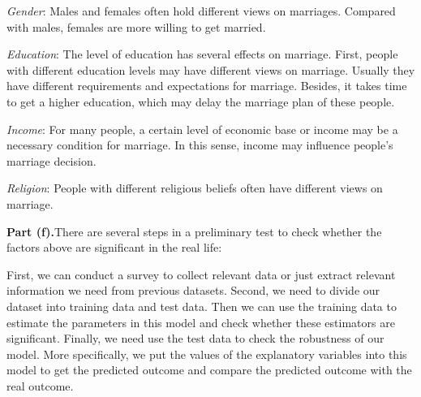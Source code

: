 \documentclass[letterpaper,12pt]{article}
\theoremstyle{definition}
\begin{document}
\emph{Gender}: Males and females often hold different views on marriages. Compared with males, females are more willing to get married.

\emph{Education}: The level of education has several effects on marriage. First, people with different education levels may have different views on marriage. Usually they have different requirements and expectations for marriage. Besides, it takes time to get a higher education, which may delay the marriage plan of these people.

\emph{Income}: For many people, a certain level of economic base or income may be a necessary condition for marriage. In this sense, income may influence people’s marriage decision.

\emph{Religion}: People with different religious beliefs often have different views on marriage.

\textbf{Part (f).}There are several steps in a preliminary test to check whether the factors above are significant in the real life:

First, we can conduct a survey to collect relevant data or just extract relevant information we need from previous datasets. Second, we need to divide our dataset into training data and test data. Then we can use the training data to estimate the parameters in this model and check whether these estimators are significant. Finally, we need use the test data to check the robustness of our model. More specifically, we put the values of the explanatory variables into this model to get the predicted outcome and compare the predicted outcome with the real outcome.
\end{document}
